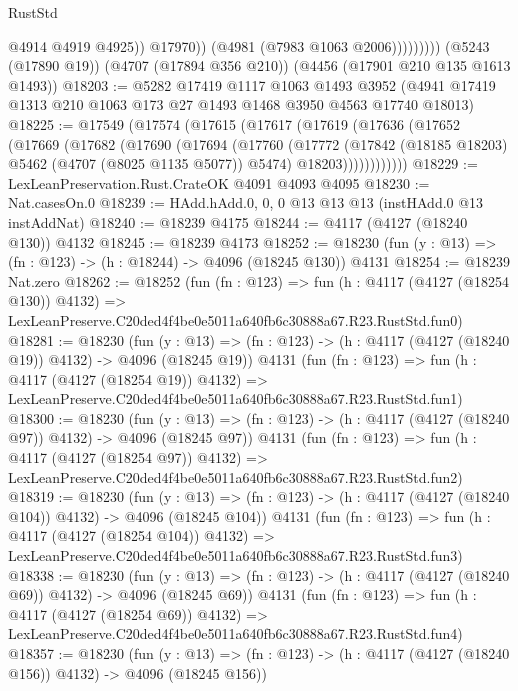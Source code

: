 \begin{lexlean}{RustStd}
\begin{coremodule}
                          @4914
                          @4919
                          @4925))
                      @17970))
                  (@4981 (@7983 @1063 @2006)))))))))
    (@5243 (@17890 @19))
    (@4707 (@17894 @356 @210))
    (@4456 (@17901 @210 @135 @1613 @1493))
@18203 := @5282
    @17419
    @1117
    @1063
    @1493
    @3952
    (@4941 @17419 @1313 @210 @1063 @173 @27 @1493 @1468 @3950 @4563 @17740 @18013)
@18225 := @17549
    (@17574
      (@17615
        (@17617
          (@17619
            (@17636
              (@17652
                (@17669
                  (@17682
                    (@17690
                      (@17694
                        (@17760
                          (@17772
                            (@17842 (@18185 @18203) @5462 (@4707 (@8025 @1135 @5077)) @5474)
                            @18203))))))))))))
@18229 := LexLeanPreservation.Rust.CrateOK @4091 @4093 @4095
@18230 := Nat.casesOn.{0}
@18239 := HAdd.hAdd.{0, 0, 0} @13 @13 @13 (instHAdd.{0} @13 instAddNat)
@18240 := @18239 @4175
@18244 := @4117 (@4127 (@18240 @130)) @4132
@18245 := @18239 @4173
@18252 := @18230 (fun (y : @13) => (fn : @123) -> (h : @18244) -> @4096 (@18245 @130)) @4131
@18254 := @18239 Nat.zero
@18262 := @18252
    (fun (fn : @123) =>
    fun (h : @4117 (@4127 (@18254 @130)) @4132) =>
    LexLeanPreserve.C20ded4f4be0e5011a640fb6c30888a67.R23.RustStd.fun0)
@18281 := @18230
    (fun (y : @13) => (fn : @123) -> (h : @4117 (@4127 (@18240 @19)) @4132) -> @4096 (@18245 @19))
    @4131
    (fun (fn : @123) =>
    fun (h : @4117 (@4127 (@18254 @19)) @4132) =>
    LexLeanPreserve.C20ded4f4be0e5011a640fb6c30888a67.R23.RustStd.fun1)
@18300 := @18230
    (fun (y : @13) => (fn : @123) -> (h : @4117 (@4127 (@18240 @97)) @4132) -> @4096 (@18245 @97))
    @4131
    (fun (fn : @123) =>
    fun (h : @4117 (@4127 (@18254 @97)) @4132) =>
    LexLeanPreserve.C20ded4f4be0e5011a640fb6c30888a67.R23.RustStd.fun2)
@18319 := @18230
    (fun (y : @13) => (fn : @123) -> (h : @4117 (@4127 (@18240 @104)) @4132) -> @4096 (@18245 @104))
    @4131
    (fun (fn : @123) =>
    fun (h : @4117 (@4127 (@18254 @104)) @4132) =>
    LexLeanPreserve.C20ded4f4be0e5011a640fb6c30888a67.R23.RustStd.fun3)
@18338 := @18230
    (fun (y : @13) => (fn : @123) -> (h : @4117 (@4127 (@18240 @69)) @4132) -> @4096 (@18245 @69))
    @4131
    (fun (fn : @123) =>
    fun (h : @4117 (@4127 (@18254 @69)) @4132) =>
    LexLeanPreserve.C20ded4f4be0e5011a640fb6c30888a67.R23.RustStd.fun4)
@18357 := @18230
    (fun (y : @13) => (fn : @123) -> (h : @4117 (@4127 (@18240 @156)) @4132) -> @4096 (@18245 @156))

\end{coremodule}
\end{lexlean}
